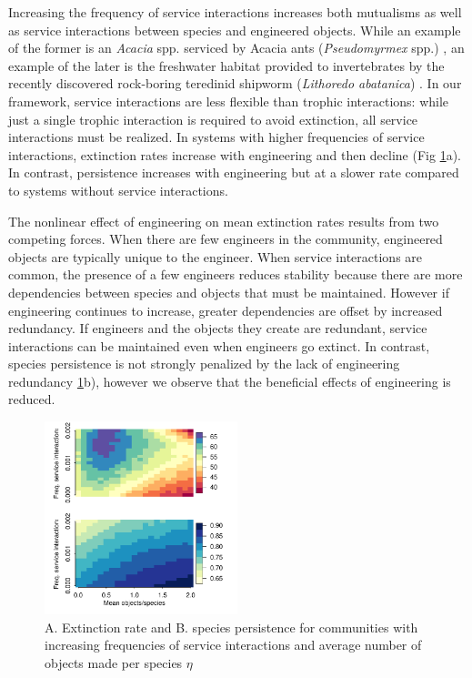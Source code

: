 \documentclass[9pt,twocolumn,twoside]{pnas-new}
\begin{document}
Increasing the frequency of service interactions increases both mutualisms as well as service interactions between species and engineered objects.
While an example of the former is an \emph{Acacia} spp. serviced by Acacia ants (\emph{Pseudomyrmex} spp.) \cite{Janzen1966,Guimaraes2006}, an example of the later is the freshwater habitat provided to invertebrates by the recently discovered rock-boring teredinid shipworm (\emph{Lithoredo abatanica}) \cite{Shipway2019}.
In our framework, service interactions are less flexible than trophic interactions: while just a single trophic interaction is required to avoid extinction, all service interactions must be realized.
In systems with higher frequencies of service interactions, extinction rates increase with engineering and then decline (Fig \ref{fig:engineers}a).
In contrast, persistence increases with engineering but at a slower rate compared to systems without service interactions.

The nonlinear effect of engineering on mean extinction rates results from two competing forces.
When there are few engineers in the community, engineered objects are typically unique to the engineer.
When service interactions are common, the presence of a few engineers reduces stability because there are more dependencies between species and objects that must be maintained.
However if engineering continues to increase, greater dependencies are offset by increased redundancy.
If engineers and the objects they create are redundant, service interactions can be maintained even when engineers go extinct.
In contrast, species persistence is not strongly penalized by the lack of engineering redundancy \ref{fig:engineers}b), however we observe that the beneficial effects of engineering is reduced.




\begin{figure}
\centering
\includegraphics[width=0.5\textwidth]{fig_engineers2.pdf}
\caption{
A. Extinction rate and 
B. species persistence for communities with increasing frequencies of service interactions and average number of objects made per species $\eta$
}
\label{fig:engineers}
\end{figure}
\end{document}
